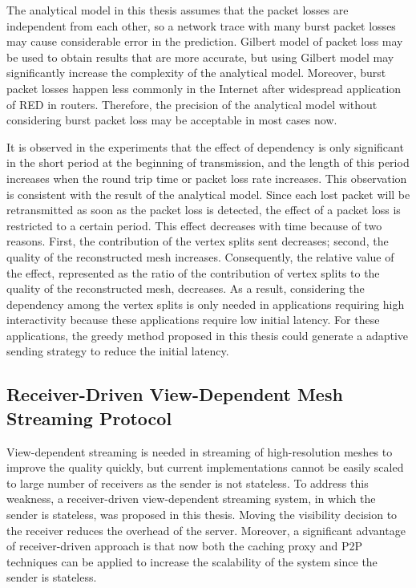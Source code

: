The analytical model in this thesis assumes that the packet losses 
are independent from each other, 
so a network trace with many burst packet losses may cause considerable error in the prediction. 
Gilbert model of packet loss may be used to obtain results that are more accurate, 
but using Gilbert model may significantly increase the complexity of the analytical model. 
Moreover, burst packet losses happen less commonly in the Internet
after widespread application of RED in routers. 
Therefore, the precision of the analytical model
without considering burst packet loss may be acceptable in most cases now.

It is observed in the experiments that the effect of dependency
is only significant in the short period at the beginning of transmission, 
and the length of this period increases
when the round trip time or packet loss rate increases. 
This observation is consistent with the result of the analytical model. 
Since each lost packet will be retransmitted as soon as the packet loss is detected, 
the effect of a packet loss is restricted to a certain period. 
This effect decreases with time because of two reasons. 
First, the contribution of the vertex splits sent decreases; 
second, the quality of the reconstructed mesh increases. 
Consequently, the relative value of the effect, 
represented as the ratio of the contribution of vertex
splits to the quality of the reconstructed mesh, decreases.
As a result, considering the dependency among the vertex splits 
is only needed in applications requiring high interactivity
because these applications require low initial latency. 
For these applications, the greedy method proposed in this thesis
could generate a adaptive sending strategy to reduce the initial latency. 

\subsection{Receiver-Driven View-Dependent Mesh Streaming Protocol}
View-dependent streaming is needed in streaming of high-resolution meshes
to improve the quality quickly, but current implementations cannot be easily scaled
to large number of receivers as the sender is not stateless. 
To address this weakness, a receiver-driven view-dependent streaming system,
in which the sender is stateless, was proposed in this thesis. 
Moving the visibility decision to the receiver reduces the overhead of the server. 
Moreover, a significant advantage of receiver-driven approach is that
now both the caching proxy and P2P techniques can be applied to increase the scalability of the system
since the sender is stateless. 


